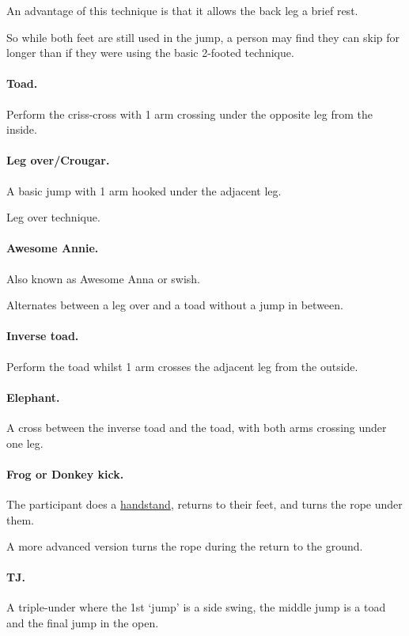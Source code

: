 \documentclass[oneside]{book}
\numberwithin{equation}{section}
\begin{document}
An advantage of this technique is that it allows the back leg a brief rest.

So while both feet are still used in the jump, a person may find they can skip for longer than if they were using the basic 2-footed technique.

\paragraph{Toad.} Perform the criss-cross with 1 arm crossing under the opposite leg from the inside. 

\paragraph{Leg over/Crougar.} A basic jump with 1 arm hooked under the adjacent leg.

\textsf{Leg over technique.}

\paragraph{Awesome Annie.} Also known as Awesome Anna or swish.

Alternates between a leg over and a toad without a jump in between.

\paragraph{Inverse toad.} Perform the toad whilst 1 arm crosses the adjacent leg from the outside.

\paragraph{Elephant.} A cross between the inverse toad and the toad, with both arms crossing under one leg.

\paragraph{Frog or Donkey kick.} The participant does a \href{https://en.wikipedia.org/wiki/Handstand}{handstand}, returns to their feet, and turns the rope under them.

A more advanced version turns the rope during the return to the ground.

\paragraph{TJ.} A triple-under where the 1st `jump' is a side swing, the middle jump is a toad and the final jump in the open.
\end{document}
